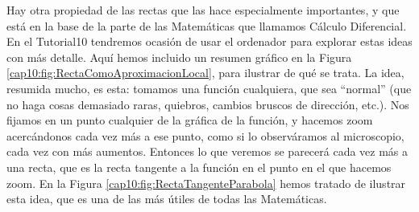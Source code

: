 Hay otra propiedad de las rectas que las hace especialmente importantes, y que está en la base de la parte de las Matemáticas que llamamos Cálculo Diferencial. En el Tutorial10 tendremos ocasión de usar el ordenador para explorar estas ideas con más detalle. Aquí hemos incluido un resumen gráfico en la Figura \ref{cap10:fig:RectaComoAproximacionLocal}, para ilustrar de qué se trata. La idea, resumida mucho, es esta: tomamos una función cualquiera, que sea ``normal'' (que no haga cosas demasiado raras, quiebros, cambios bruscos de dirección, etc.). Nos fijamos en un punto cualquier de la gráfica de la función, y hacemos zoom acercándonos cada vez más a ese punto, como si lo observáramos al microscopio, cada vez con más aumentos. Entonces lo que veremos se parecerá cada vez más a una recta, que es la {\sf recta tangente}  a la función en el punto en el que hacemos zoom. En la Figura \ref{cap10:fig:RectaTangenteParabola}
hemos tratado de ilustrar esta idea, que es una de las más útiles de todas las Matemáticas.
